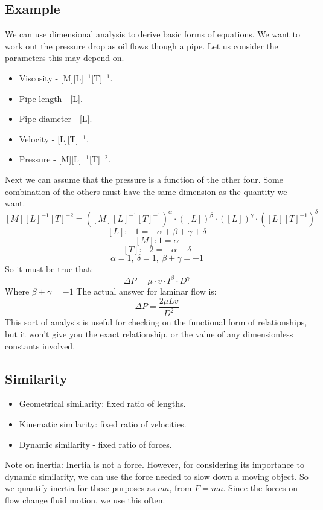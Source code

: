 \documentclass[class=report, crop=false, 12pt,a4paper]{standalone}
\begin{document}
\subsection{Example}
We can use dimensional analysis to derive basic forms of equations. We want to work out the pressure drop as oil flows though a pipe. Let us consider the parameters this may depend on. 
\begin{itemize}[noitemsep]
  \item Viscosity - [M][L]\(^{-1}\)[T]\(^{-1}\).
  \item Pipe length - [L].
  \item Pipe diameter - [L].
  \item Velocity - [L][T]\(^{-1}\).
  \item Pressure - [M][L]\(^{-1}\)[T]\(^{-2}\).
\end{itemize}
Next we can assume that the pressure is a function of the other four. Some combination of the others must have the same dimension as the quantity we want.
\[ [M][L]^{-1}[T]^{-2} = ([M][L]^{-1}[T]^{-1})^\alpha \cdot ([L])^\beta \cdot ([L])^\gamma \cdot ([L][T]^{-1})^\delta \]
\[ [L]: -1 = -\alpha + \beta + \gamma + \delta\]
\[ [M]: 1 = \alpha \]
\[ [T]: -2 = -\alpha -\delta \]
\[\alpha =1, \ \delta =1, \ \beta + \gamma = -1\]
So it must be true that:
\[ \Delta P = \mu \cdot v \cdot I^{\beta} \cdot D^{\gamma}\] 
Where \(\beta + \gamma = -1\)
The actual answer for laminar flow is:
\[ \Delta P = \frac{2\mu L v}{D^2}\]
This sort of analysis is useful for checking on the functional form of relationships, but it won't give you the exact relationship, or the value of any dimensionless constants involved.
\subsection{Similarity}
\begin{itemize}[noitemsep]
  \item Geometrical similarity: fixed ratio of lengths.
  \item Kinematic similarity: fixed ratio of velocities.
  \item Dynamic similarity - fixed ratio of forces.
\end{itemize}
Note on inertia: Inertia is not a force. However, for considering its importance to dynamic similarity, we can use the force needed to slow down a moving object. So we quantify inertia for these purposes as \(ma\), from \(F = ma\). Since the forces on flow change fluid motion, we use this often. 
\end{document}
